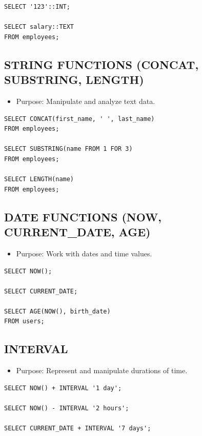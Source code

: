 \documentclass[10pt]{article}
\begin{document}
\begin{verbatim}
SELECT '123'::INT;

SELECT salary::TEXT
FROM employees;
\end{verbatim}

\subsection{STRING FUNCTIONS (CONCAT, SUBSTRING, LENGTH)}
\begin{itemize}
    \item Purpose: Manipulate and analyze text data.
\end{itemize}

\begin{verbatim}
SELECT CONCAT(first_name, ' ', last_name)
FROM employees;

SELECT SUBSTRING(name FROM 1 FOR 3)
FROM employees;

SELECT LENGTH(name)
FROM employees;
\end{verbatim}

\subsection{DATE FUNCTIONS (NOW, CURRENT\_DATE, AGE)}
\begin{itemize}
    \item Purpose: Work with dates and time values.
\end{itemize}

\begin{verbatim}
SELECT NOW();

SELECT CURRENT_DATE;

SELECT AGE(NOW(), birth_date)
FROM users;
\end{verbatim}

\subsection{INTERVAL}
\begin{itemize}
    \item Purpose: Represent and manipulate durations of time.
\end{itemize}

\begin{verbatim}
SELECT NOW() + INTERVAL '1 day';

SELECT NOW() - INTERVAL '2 hours';

SELECT CURRENT_DATE + INTERVAL '7 days';
\end{verbatim}
\end{document}
